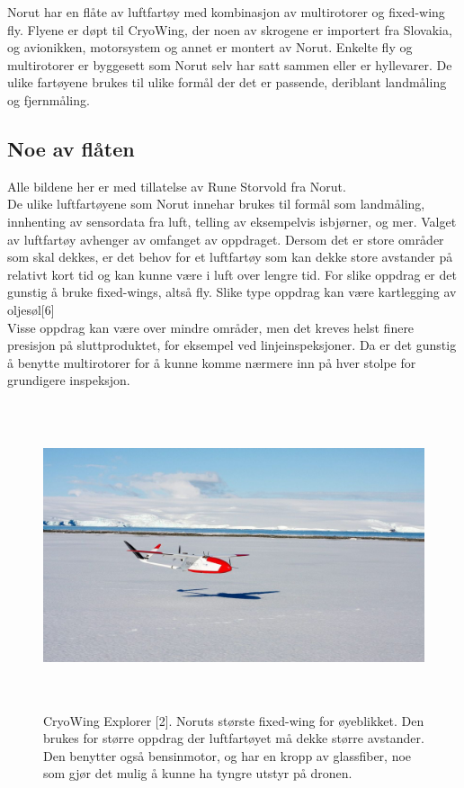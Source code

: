 \documentclass[12pt, a4paper]{article}
\begin{document}
Norut har en flåte av luftfartøy med kombinasjon av multirotorer og fixed-wing fly. Flyene er døpt til CryoWing, der noen av skrogene er importert fra Slovakia, og avionikken, motorsystem og annet er montert av Norut. Enkelte fly og multirotorer er byggesett som Norut selv har satt sammen eller er hyllevarer. De ulike fartøyene brukes til ulike formål der det er passende, deriblant landmåling og fjernmåling.\\
\newpage

\subsection{Noe av flåten}
Alle bildene her er med tillatelse av Rune Storvold fra Norut. \\ 
De ulike luftfartøyene som Norut innehar brukes til formål som landmåling, innhenting av sensordata fra luft, telling av eksempelvis isbjørner, og mer. Valget av luftfartøy avhenger av omfanget av oppdraget. Dersom det er store områder som skal dekkes, er det behov for et luftfartøy som kan dekke store avstander på relativt kort tid og kan kunne være i luft over lengre tid. For slike oppdrag er det gunstig å bruke fixed-wings, altså fly. Slike type oppdrag kan være kartlegging av oljesøl[6] \\
Visse oppdrag kan være over mindre områder, men det kreves helst finere presisjon på sluttproduktet, for eksempel ved linjeinspeksjoner. Da er det gunstig å benytte multirotorer for å kunne komme nærmere inn på hver stolpe for grundigere inspeksjon. 

\begin{figure}[hpbt]
	\centering
	\includegraphics[width=.6\textwidth, height=9cm]{bilder/CryoWing_Explorer.jpeg}
	\caption[CryoWing Explorer]{CryoWing Explorer [2]. Noruts største fixed-wing for øyeblikket. Den brukes for større oppdrag der luftfartøyet må dekke større avstander. Den benytter også bensinmotor, og har en kropp av glassfiber, noe som gjør det mulig å kunne ha tyngre utstyr på dronen.}
\end{figure}
\end{document}
